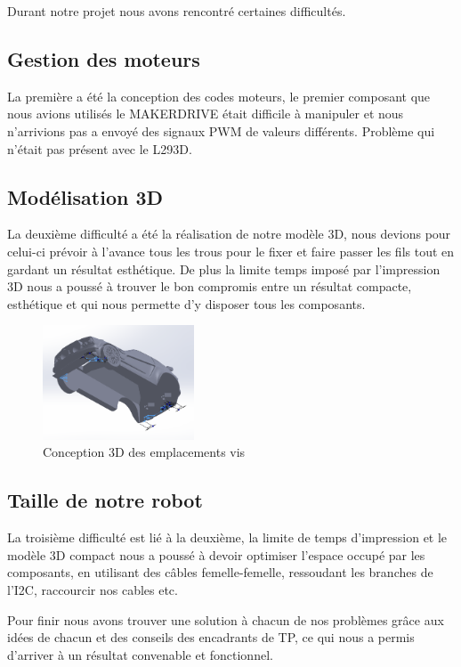 Durant notre projet nous avons rencontré certaines difficultés.

\subsection{Gestion des moteurs}
La première a été la conception des codes moteurs, le premier composant que nous avions utilisés le MAKERDRIVE était difficile à manipuler et nous n'arrivions pas a envoyé des signaux PWM de valeurs différents. Problème qui n'était pas présent avec le L293D.

\subsection{Modélisation 3D}
La deuxième difficulté a été la réalisation de notre modèle 3D, nous devions pour celui-ci prévoir à l'avance tous les trous pour le fixer et faire passer les fils tout en gardant un résultat esthétique. De plus la limite temps imposé par l'impression 3D nous a poussé à trouver le bon compromis entre un résultat compacte, esthétique et qui nous permette d'y disposer tous les composants.

\begin{figure}[h]
    \centering
    \includegraphics[width=0.4\textwidth]{images/solidworks/solidworks2.png}
    \caption{Conception 3D des emplacements vis}
    \label{fig:Conception 3D emplacements vis}
\end{figure}

\subsection{Taille de notre robot}
La troisième difficulté est lié à la deuxième, la limite de temps d'impression et le modèle 3D compact nous a poussé à devoir optimiser l'espace occupé par les composants, en utilisant des câbles femelle-femelle, ressoudant les branches de l'I2C, raccourcir nos cables etc.

Pour finir nous avons trouver une solution à chacun de nos problèmes grâce aux idées de chacun et des conseils des encadrants de TP, ce qui nous a permis d'arriver à un résultat convenable et fonctionnel.

\newpage
